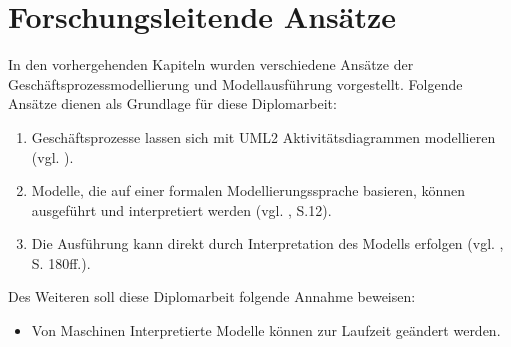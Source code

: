 \chapter{Forschungsleitende Ansätze}


In den vorhergehenden Kapiteln wurden verschiedene Ansätze der Geschäftsprozessmodellierung und Modellausführung vorgestellt. Folgende Ansätze dienen als Grundlage für diese Diplomarbeit:

\begin{enumerate}
\item Geschäftsprozesse lassen sich mit UML2 Aktivitätsdiagrammen modellieren (vgl. \citep{White2004}).
\item Modelle, die auf einer formalen Modellierungssprache basieren, können ausgeführt und interpretiert werden (vgl. \citep{OMG2008}, S.12).
\item Die Ausführung kann direkt durch Interpretation des Modells erfolgen (vgl. \citep{Crane2009}, S. 180ff.).
\end{enumerate}

Des Weiteren soll diese Diplomarbeit folgende Annahme beweisen:
\begin{itemize}
\item Von Maschinen Interpretierte Modelle können zur Laufzeit geändert werden.
\end{itemize}


